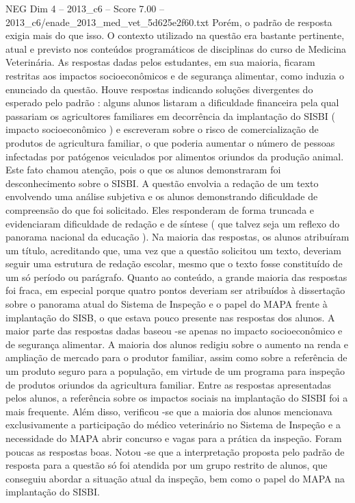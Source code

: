 \begin{textsample}{NEG Dim 4 – 2013\_c6 – Score 7.00 – 2013\_c6/enade\_2013\_med\_vet\_5d625e2f60.txt}
Porém, o padrão de resposta exigia mais do que isso.
O contexto utilizado na questão era bastante pertinente, atual e previsto nos conteúdos programáticos de disciplinas do curso de Medicina Veterinária.
As respostas dadas pelos estudantes, em sua maioria, ficaram restritas aos impactos socioeconômicos e de segurança alimentar, como induzia o enunciado da questão.
Houve respostas indicando soluções divergentes do esperado pelo padrão : alguns alunos listaram a dificuldade financeira pela qual passariam os agricultores familiares em decorrência da implantação do SISBI ( impacto socioeconômico ) e escreveram sobre o risco de comercialização de produtos de agricultura familiar, o que poderia aumentar o número de pessoas infectadas por patógenos veiculados por alimentos oriundos da produção animal.
Este fato chamou atenção, pois o que os alunos demonstraram foi desconhecimento sobre o SISBI.
A questão envolvia a redação de um texto envolvendo uma análise subjetiva e os alunos demonstrando dificuldade de compreensão do que foi solicitado.
Eles responderam de forma truncada e evidenciaram dificuldade de redação e de síntese ( que talvez seja um reflexo do panorama nacional da educação ).
Na maioria das respostas, os alunos atribuíram um título, acreditando que, uma vez que a questão solicitou um texto, deveriam seguir uma estrutura de redação escolar, mesmo que o texto fosse constituído de um só período ou parágrafo.
Quanto ao conteúdo, a grande maioria das respostas foi fraca, em especial porque quatro pontos deveriam ser atribuídos à dissertação sobre o panorama atual do Sistema de Inspeção e o papel do MAPA frente à implantação do SISB, o que estava pouco presente nas respostas dos alunos.
A maior parte das respostas dadas baseou -se apenas no impacto socioeconômico e de segurança alimentar.
A maioria dos alunos redigiu sobre o aumento na renda e ampliação de mercado para o produtor familiar, assim como sobre a referência de um produto seguro para a população, em virtude de um programa para inspeção de produtos oriundos da agricultura familiar.
Entre as respostas apresentadas pelos alunos, a referência sobre os impactos sociais na implantação do SISBI foi a mais frequente.
Além disso, verificou -se que a maioria dos alunos mencionava exclusivamente a participação do médico veterinário no Sistema de Inspeção e a necessidade do MAPA abrir concurso e vagas para a prática da inspeção.
Foram poucas as respostas boas.
Notou -se que a interpretação proposta pelo padrão de resposta para a questão só foi atendida por um grupo restrito de alunos, que conseguiu abordar a situação atual da inspeção, bem como o papel do MAPA na implantação do SISBI.

\end{textsample}
